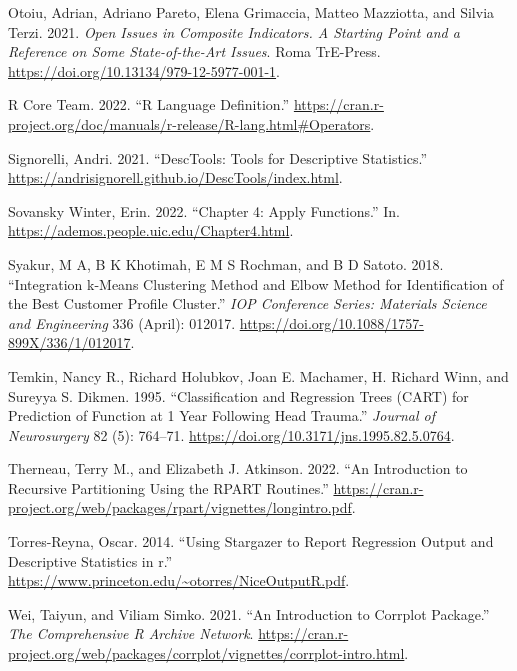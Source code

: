 \documentclass[
]{svmono}
\newlength{\cslhangindent}
\newlength{\cslentryspacingunit} %
\newenvironment{CSLReferences}[2] %
 {%
  \setlength{\parindent}{0pt}
  \ifodd #1
  \let\oldpar\par
  \def\par{\hangindent=\cslhangindent\oldpar}
  \fi
  \setlength{\parskip}{#2\cslentryspacingunit}
 }%
 {}
\begin{document}
\begin{CSLReferences}{1}{0}
\leavevmode{}%
Otoiu, Adrian, Adriano Pareto, Elena Grimaccia, Matteo Mazziotta, and Silvia Terzi. 2021. \emph{Open Issues in Composite Indicators. A Starting Point and a Reference on Some State-of-the-Art Issues}. Roma TrE-Press. \url{https://doi.org/10.13134/979-12-5977-001-1}.

\leavevmode{}%
R Core Team. 2022. {``R Language Definition.''} \url{https://cran.r-project.org/doc/manuals/r-release/R-lang.html\#Operators}.

\leavevmode{}%
Signorelli, Andri. 2021. {``DescTools: Tools for Descriptive Statistics.''} \url{https://andrisignorell.github.io/DescTools/index.html}.

\leavevmode{}%
Sovansky Winter, Erin. 2022. {``Chapter 4: Apply Functions.''} In. \url{https://ademos.people.uic.edu/Chapter4.html}.

\leavevmode{}%
Syakur, M A, B K Khotimah, E M S Rochman, and B D Satoto. 2018. {``Integration k-Means Clustering Method and Elbow Method for Identification of the Best Customer Profile Cluster.''} \emph{IOP Conference Series: Materials Science and Engineering} 336 (April): 012017. \url{https://doi.org/10.1088/1757-899X/336/1/012017}.

\leavevmode{}%
Temkin, Nancy R., Richard Holubkov, Joan E. Machamer, H. Richard Winn, and Sureyya S. Dikmen. 1995. {``Classification and Regression Trees (CART) for Prediction of Function at 1 Year Following Head Trauma.''} \emph{Journal of Neurosurgery} 82 (5): 764--71. \url{https://doi.org/10.3171/jns.1995.82.5.0764}.

\leavevmode{}%
Therneau, Terry M., and Elizabeth J. Atkinson. 2022. {``An Introduction to Recursive Partitioning Using the RPART Routines.''} \url{https://cran.r-project.org/web/packages/rpart/vignettes/longintro.pdf}.

\leavevmode{}%
Torres-Reyna, Oscar. 2014. {``Using Stargazer to Report Regression Output and Descriptive Statistics in r.''} \url{https://www.princeton.edu/~otorres/NiceOutputR.pdf}.

\leavevmode{}%
Wei, Taiyun, and Viliam Simko. 2021. {``An Introduction to Corrplot Package.''} \emph{The Comprehensive R Archive Network}. \url{https://cran.r-project.org/web/packages/corrplot/vignettes/corrplot-intro.html}.


\end{CSLReferences}
\end{document}
